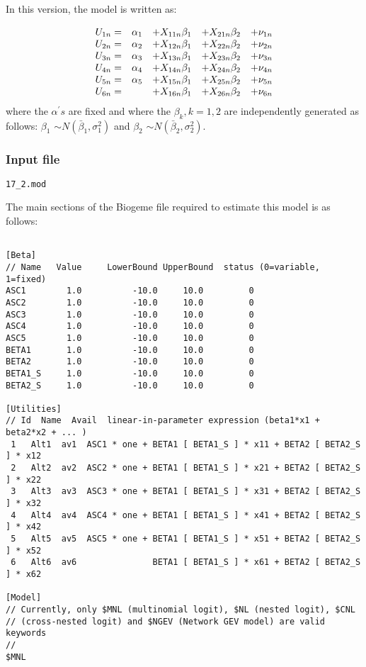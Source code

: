 \documentclass[12pt]{memoir}
\begin{document}
In this version, the model is written as:%

\begin{equation}%
\begin{array}
[c]{ccccc}%
U_{1n}= & \alpha_{1} & + X_{11n}\beta_{1} & + X_{21n}\beta_{2} & + \nu_{1n}\\
U_{2n}= & \alpha_{2} & + X_{12n}\beta_{1} & + X_{22n}\beta_{2} & + \nu_{2n}\\
U_{3n}= & \alpha_{3} & + X_{13n}\beta_{1} & + X_{23n}\beta_{2} & + \nu_{3n}\\
U_{4n}= & \alpha_{4} & + X_{14n}\beta_{1} & + X_{24n}\beta_{2} & + \nu_{4n}\\
U_{5n}= & \alpha_{5} & + X_{15n}\beta_{1} & + X_{25n}\beta_{2} & + \nu_{5n}\\
U_{6n}= &  & + X_{16n}\beta_{1} & + X_{26n}\beta_{2} & + \nu_{6n}%
\end{array}
\label{ind random coefs}%
\end{equation}
where the $\alpha^{\prime}s$ are fixed and where the $\beta_{k},k=1,2$ are
independently generated as follows: $\beta_{1}$ $\sim N(\bar{\beta}_{1}%
,\sigma_{1}^{2})$ and $\beta_{2}$ $\sim N(\bar{\beta}_{2},\sigma_{2}^{2}).$

\subsubsection{Input file}

\begin{flushright}
\verb+17_2.mod+
\end{flushright}

The main sections of the Biogeme file required to estimate this model is as follows:

\tiny
{\footnotesize
\begin{verbatim}
 
[Beta]
// Name   Value     LowerBound UpperBound  status (0=variable, 1=fixed)
ASC1        1.0          -10.0     10.0         0
ASC2        1.0          -10.0     10.0         0
ASC3        1.0          -10.0     10.0         0
ASC4        1.0          -10.0     10.0         0
ASC5        1.0          -10.0     10.0         0
BETA1       1.0          -10.0     10.0         0
BETA2       1.0          -10.0     10.0         0
BETA1_S     1.0          -10.0     10.0         0
BETA2_S     1.0          -10.0     10.0         0
 
[Utilities]
// Id  Name  Avail  linear-in-parameter expression (beta1*x1 + beta2*x2 + ... )
 1   Alt1  av1  ASC1 * one + BETA1 [ BETA1_S ] * x11 + BETA2 [ BETA2_S ] * x12 
 2   Alt2  av2  ASC2 * one + BETA1 [ BETA1_S ] * x21 + BETA2 [ BETA2_S ] * x22 
 3   Alt3  av3  ASC3 * one + BETA1 [ BETA1_S ] * x31 + BETA2 [ BETA2_S ] * x32 
 4   Alt4  av4  ASC4 * one + BETA1 [ BETA1_S ] * x41 + BETA2 [ BETA2_S ] * x42 
 5   Alt5  av5  ASC5 * one + BETA1 [ BETA1_S ] * x51 + BETA2 [ BETA2_S ] * x52 
 6   Alt6  av6               BETA1 [ BETA1_S ] * x61 + BETA2 [ BETA2_S ] * x62 
      
[Model]
// Currently, only $MNL (multinomial logit), $NL (nested logit), $CNL
// (cross-nested logit) and $NGEV (Network GEV model) are valid keywords
//
$MNL
\end{verbatim}
}
\normalsize
\end{document}
